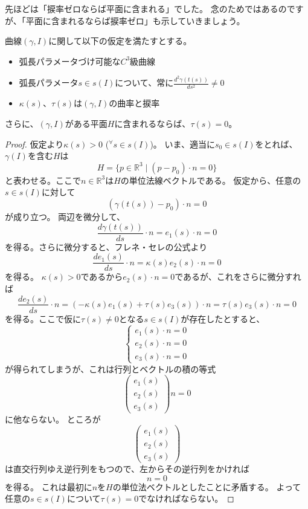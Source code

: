 先ほどは「捩率ゼロならば平面に含まれる」でした。
念のためではあるのですが、「平面に含まれるならば捩率ゼロ」も示していきましょう。
\begin{example}
  曲線$(\gamma,I)$に関して以下の仮定を満たすとする。
  \begin{itemize}
    \item 弧長パラメータづけ可能な$C^3$級曲線
    \item 弧長パラメータ$s\in s(I)$について、常に$\frac{d^2\gamma(t(s))}{ds^2}\neq0$
    \item $\kappa(s)$、$\tau(s)$は$(\gamma,I)$の曲率と捩率
  \end{itemize}
  さらに、$(\gamma,I)$がある平面$H$に含まれるならば、$\tau(s)=0$。
\end{example}
\begin{proof}
  仮定より$\kappa(s)>0$ (${}^\forall s\in s(I)$)。
  いま、適当に$s_0\in s(I)$をとれば、$\gamma(I)$を含む$H$は
  \[
    H=\{p\in\mathbb{R}^3\mid (p-p_0)\cdot n=0\}
  \]
  と表わせる。ここで$n\in\mathbb{R}^3$は$H$の単位法線ベクトルである。
  仮定から、任意の$s\in s(I)$に対して
  \[
    (\gamma(t(s))-p_0)\cdot n=0
  \]
  が成り立つ。
  両辺を微分して、
  \[
    \frac{d\gamma(t(s))}{ds}\cdot n=e_1(s)\cdot n=0
  \]
  を得る。さらに微分すると、フレネ・セレの公式より
  \[
    \frac{de_1(s)}{ds}\cdot n=\kappa(s)e_2(s)\cdot n=0
  \]
  を得る。
  $\kappa(s)>0$であるから$e_2(s)\cdot n=0$であるが、これをさらに微分すれば
  \[
    \frac{de_2(s)}{ds}\cdot n=(-\kappa(s)e_1(s)+\tau(s)e_3(s))\cdot n=\tau(s)e_3(s)\cdot n=0
  \]
  を得る。ここで仮に$\tau(s)\neq0$となる$s\in s(I)$が存在したとすると、
  \[
    \begin{cases}
      e_1(s)\cdot n=0\\
      e_2(s)\cdot n=0\\
      e_3(s)\cdot n=0
    \end{cases}
  \]
  が得られてしまうが、これは行列とベクトルの積の等式
  \[
    \begin{pmatrix}
      e_1(s)\\
      e_2(s)\\
      e_3(s)
    \end{pmatrix}
    n=0
  \]
  に他ならない。
  ところが
  \[
    \begin{pmatrix}
      e_1(s)\\
      e_2(s)\\
      e_3(s)
    \end{pmatrix}
  \]
  は直交行列ゆえ逆行列をもつので、左からその逆行列をかければ
  \[
    n=0
  \]
  を得る。
  これは最初に$n$を$H$の単位法ベクトルとしたことに矛盾する。
  よって任意の$s\in s(I)$について$\tau(s)=0$でなければならない。
\end{proof}

